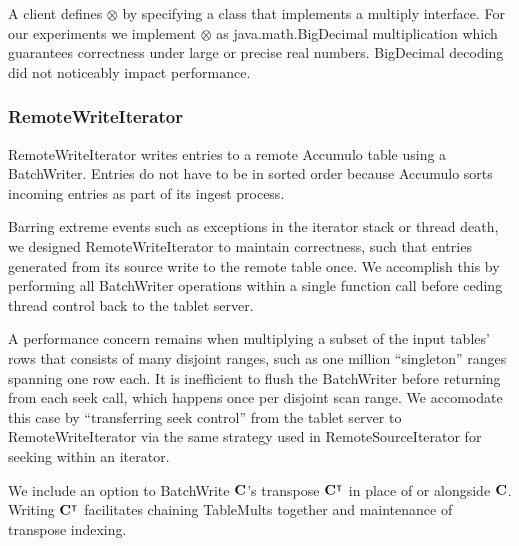 A client defines $\otimes$ by specifying a class 
that implements a multiply interface.
For our experiments we implement $\otimes$ as java.math.BigDecimal multiplication
which guarantees correctness under large or precise real numbers.
BigDecimal decoding did not noticeably impact performance.

\subsubsection{RemoteWriteIterator}
RemoteWriteIterator writes entries to a remote Accumulo table using a BatchWriter. %
Entries do not have to be in sorted order because Accumulo sorts incoming entries as part of its
 ingest process. 

Barring extreme events such as exceptions in the iterator stack or thread death,
we designed RemoteWriteIterator to maintain correctness, such that entries generated from
its source write to the remote table once.
We accomplish this by performing all BatchWriter operations within a single function call
before ceding thread control back to the tablet server.  

A performance concern remains when multiplying a subset of the input tables' rows 
that consists of many disjoint ranges, such as one million ``singleton'' ranges spanning one row each.
It is inefficient to flush the BatchWriter before returning from each seek call, which happens once per 
disjoint scan range. %
We accomodate this case by ``transferring seek control'' %
from the tablet server to RemoteWriteIterator 
via the same strategy used in RemoteSourceIterator for seeking within an iterator.

We include an option to BatchWrite $\mathbf{C}$'s transpose $\mathbf{C^{\intercal}}$ in place of or alongside $\mathbf{C}$. 
Writing $\mathbf{C^{\intercal}}$ facilitates chaining TableMults together
and maintenance of transpose indexing.

